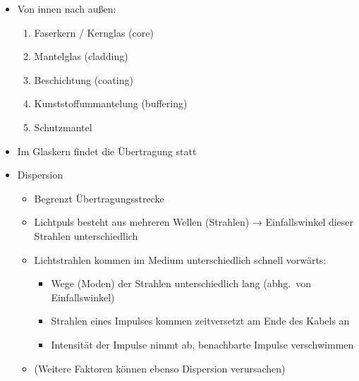 \begin{itemize}
    \item Von innen nach außen:
    \begin{enumerate}
        \item Faserkern / Kernglas (core)
        \item Mantelglas (cladding)
        \item Beschichtung (coating)
        \item Kunststoffummantelung (buffering)
        \item Schutzmantel
    \end{enumerate}
    \item Im Glaskern findet die Übertragung statt
\end{itemize}

\begin{itemize}
    \item Dispersion
    \begin{itemize}
        \item Begrenzt Übertragungsstrecke
        \item Lichtpuls besteht aus mehreren Wellen (Strahlen) → Einfallswinkel dieser Strahlen unterschiedlich
        \item Lichtstrahlen kommen im Medium unterschiedlich schnell vorwärts:
        \begin{itemize}
            \item Wege (Moden) der Strahlen unterschiedlich lang (abhg.\ von Einfallswinkel)
            \item Strahlen eines Impulses kommen zeitversetzt am Ende des Kabels an
            \item Intensität der Impulse nimmt ab, benachbarte Impulse verschwimmen
        \end{itemize}
        \item (Weitere Faktoren können ebenso Dispersion verursachen)
    \end{itemize}
\end{itemize}

